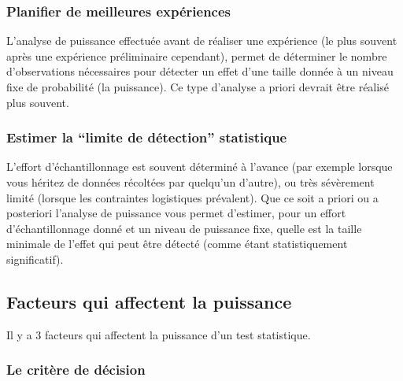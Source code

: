 \documentclass[12pt,]{book}
\begin{document}
\hypertarget{planifier-de-meilleures-expuxe9riences}{%
\subsubsection*{Planifier de meilleures expériences}\label{planifier-de-meilleures-expuxe9riences}}

L'analyse de puissance effectuée avant de réaliser une expérience (le plus souvent après une expérience préliminaire cependant), permet de déterminer le nombre d'observations nécessaires pour détecter un effet d'une taille donnée à un niveau fixe de probabilité (la puissance).
Ce type d'analyse a priori devrait être réalisé plus souvent.

\hypertarget{estimer-la-limite-de-duxe9tection-statistique}{%
\subsubsection*{Estimer la ``limite de détection'' statistique}\label{estimer-la-limite-de-duxe9tection-statistique}}

L'effort d'échantillonnage est souvent déterminé à l'avance (par exemple lorsque vous héritez de données récoltées par quelqu'un d'autre), ou très sévèrement limité (lorsque les contraintes logistiques prévalent).
Que ce soit a priori ou a posteriori l'analyse de puissance vous permet d'estimer, pour un effort d'échantillonnage donné et un niveau de puissance fixe, quelle est la taille minimale de l'effet qui peut être détecté (comme étant statistiquement significatif).

\hypertarget{facteurs-qui-affectent-la-puissance}{%
\subsection{Facteurs qui affectent la puissance}\label{facteurs-qui-affectent-la-puissance}}

Il y a 3 facteurs qui affectent la puissance d'un test statistique.

\hypertarget{le-crituxe8re-de-duxe9cision}{%
\subsubsection*{Le critère de décision}\label{le-crituxe8re-de-duxe9cision}}
\end{document}
